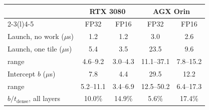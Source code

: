 \setlength{\tabcolsep}{4pt}
\begin{tabular}{@{}lcccc@{}}
\toprule
 & \multicolumn{2}{c}{RTX 3080} & \multicolumn{2}{c}{AGX Orin} \\
\cmidrule(lr){2-3}\cmidrule(l){4-5}
 & FP32 & FP16 & FP32 & FP16 \\
\midrule
Launch, no work ($\mu$s) & 1.2 & 1.2 & 3.0 & 2.6 \\
Launch, one tile ($\mu$s) & 5.4 & 3.5 & 23.5 & 9.6 \\
\quad range & 4.6--9.2 & 3.0--4.3 & 11.1--37.1 & 7.8--15.2 \\
Intercept $b$ ($\mu$s) & 7.8 & 4.4 & 29.5 & 12.2 \\
\quad range & 5.2--11.1 & 3.4--6.9 & 12.5--50.2 & 6.4--17.3 \\
$b/t_{\mathrm{dense}}$, all layers & 10.0\% & 14.9\% & 5.6\% & 17.4\% \\
\bottomrule
\end{tabular}
